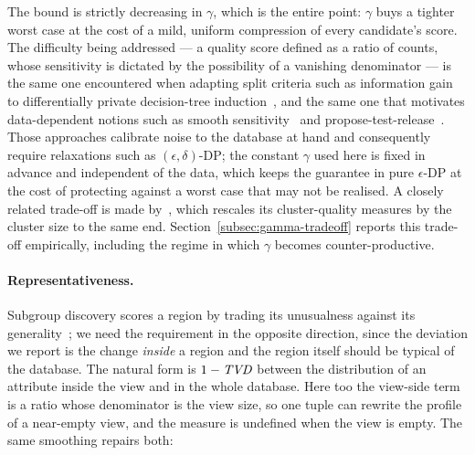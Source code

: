 The bound is strictly decreasing in $\gamma$, which is the entire point: $\gamma$ buys a tighter worst case at the cost of a mild, uniform compression of every candidate's score.
The difficulty being addressed --- a quality score defined as a ratio of counts, whose sensitivity is dictated by the possibility of a vanishing denominator --- is the same one encountered when adapting split criteria such as information gain to differentially private decision-tree induction~\cite{FriedmanSchuster10}, and the same one that motivates data-dependent notions such as smooth sensitivity~\cite{NissimRS07} and propose-test-release~\cite{DworkLei09}.
Those approaches calibrate noise to the database at hand and consequently require relaxations such as $(\epsilon,\delta)$-DP; the constant $\gamma$ used here is fixed in advance and independent of the data, which keeps the guarantee in pure $\epsilon$-DP at the cost of protecting against a worst case that may not be realised.
A closely related trade-off is made by~\cite{DPClustX}, which rescales its cluster-quality measures by the cluster size to the same end.
Section~\ref{subsec:gamma-tradeoff} reports this trade-off empirically, including the regime in which $\gamma$ becomes counter-productive.

\paragraph{Representativeness.}
Subgroup discovery scores a region by trading its unusualness against its generality~\cite{Wrobel97,HerreraCGJ11}; we need the requirement in the opposite direction, since the deviation we report is the change \emph{inside} a region and the region itself should be typical of the database.
The natural form is $1-\mathit{TVD}$ between the distribution of an attribute inside the view and in the whole database.
Here too the view-side term is a ratio whose denominator is the view size, so one tuple can rewrite the profile of a near-empty view, and the measure is undefined when the view is empty.
The same smoothing repairs both:


